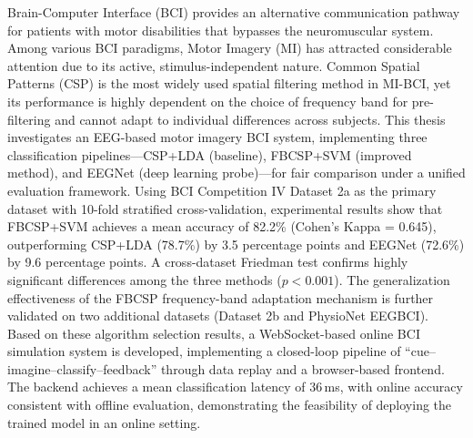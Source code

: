 {\textrm{%
	\mdseries
	\setlength{\baselineskip}{25pt}%
	\setlength{\parindent}{2em}%
	\setlength{\parskip}{0pt}%
	Brain-Computer Interface (BCI) provides an alternative communication pathway for patients with motor disabilities that bypasses the neuromuscular system. Among various BCI paradigms, Motor Imagery (MI) has attracted considerable attention due to its active, stimulus-independent nature. Common Spatial Patterns (CSP) is the most widely used spatial filtering method in MI-BCI, yet its performance is highly dependent on the choice of frequency band for pre-filtering and cannot adapt to individual differences across subjects. This thesis investigates an EEG-based motor imagery BCI system, implementing three classification pipelines---CSP+LDA (baseline), FBCSP+SVM (improved method), and EEGNet (deep learning probe)---for fair comparison under a unified evaluation framework. Using BCI Competition IV Dataset 2a as the primary dataset with 10-fold stratified cross-validation, experimental results show that FBCSP+SVM achieves a mean accuracy of 82.2\% (Cohen's Kappa = 0.645), outperforming CSP+LDA (78.7\%) by 3.5 percentage points and EEGNet (72.6\%) by 9.6 percentage points. A cross-dataset Friedman test confirms highly significant differences among the three methods ($p < 0.001$). The generalization effectiveness of the FBCSP frequency-band adaptation mechanism is further validated on two additional datasets (Dataset 2b and PhysioNet EEGBCI). Based on these algorithm selection results, a WebSocket-based online BCI simulation system is developed, implementing a closed-loop pipeline of ``cue--imagine--classify--feedback'' through data replay and a browser-based frontend. The backend achieves a mean classification latency of 36\,ms, with online accuracy consistent with offline evaluation, demonstrating the feasibility of deploying the trained model in an online setting.}}

\vspace*{6pt}
\noindent\textrm{\mdseries\setlength{\baselineskip}{25pt}\sdnukeywen}


\label{abstract}  %
